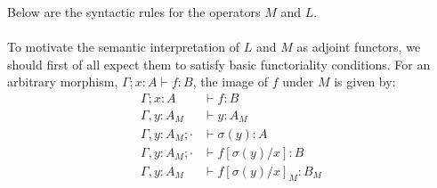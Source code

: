 Below are the syntactic rules for the operators $M$ and $L$. \\
\\
To motivate the semantic interpretation of $L$ and $M$ as adjoint functors, we should first of all expect them to satisfy basic functoriality conditions. For an arbitrary morphism, $\Gamma; x : A \vdash f : B$, the image of $f$ under $M$ is given by:\\
\[
  \begin{split}
  \Gamma; x : A &\vdash f : B\\
  \Gamma, y : A_M &\vdash y : A_M\\
  \Gamma, y : A_M; \cdot &\vdash \sigma(y) : A\\
  \Gamma, y : A_M; \cdot &\vdash f[\sigma(y)/x] : B\\
  \Gamma, y : A_M &\vdash f[\sigma(y)/x]_M : B_M\\
  \end{split}
\]\\
